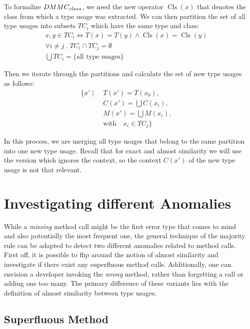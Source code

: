 To formalize $\mathnormal{DMMC}_{\mathnormal{class}}$, we need the new operator $\operatorname{Cls}(x)$ that denotes the class from which a type usage was extracted.
We can then partition the set of all type usages into subsets $TC_i$ which have the same type and class:
\begin{gather*}
    x, y \in TC_i \iff T(x) = T(y) \land \operatorname{Cls}(x) = \operatorname{Cls}(y) \\
    \forall i \ne j \;.\; TC_i \cap TC_j = \emptyset \\
    \bigcup TC_i = \{ \text{all type usages} \}
\end{gather*}

Then we iterate through the partitions and calculate the set of new type usages as follows:
\begin{align*}
    \{ x' \mid \;  & T(x') = T(x_0),\\
                & C(x') = \bigcup{C(x_i)},\\
                & M(x') = \bigcup{M(x_i)},\\
                & \text{with} \quad x_i \in TC_j \}
\end{align*}

In this process, we are merging all type usages that belong to the same partition into one new type usage.
Recall that for exact and almost similarity we will use the version which ignores the context, so the context $C(x')$ of the new type usage is not that relevant.

\section{Investigating different Anomalies}

While a \emph{missing} method call might be the first error type that comes to mind and also potentially the most frequent one, the general technique of the majority rule can be adapted to detect two different anomalies related to method calls.
First off, it is possible to flip around the notion of almost similarity and investigate if there exist any superfluous method calls.
Additionally, one can envision a developer invoking the \emph{wrong} method, rather than forgetting a call or adding one too many.
The primary difference of these variants lies with the definition of almost similarity between type usages.

\subsection{Superfluous Method}

